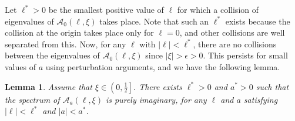 \documentclass[12pt]{amsart}    %
\newtheorem{lemma}[theorem]{Lemma}
\numberwithin{equation}{section}
\begin{document}
Let $\ell^\ast>0$ be the smallest positive value of $\ell$ for which a collision of eigenvalues of $\mathcal A_0(\ell,\xi)$ takes place. Note that such an $\ell^\ast$ exists because the collision at the origin takes place only for $\ell=0$, and other collisions are well separated from this. Now, for any $\ell$ with $|\ell|<\ell^\ast$, there are no collisions between the eigenvalues of $\mathcal A_0(\ell,\xi)$ since $|\xi|>\epsilon>0$. This persists for small values of $a$ using perturbation arguments, and we have the following lemma.  
\begin{lemma}
Assume that $\xi\in\left(0,\frac12\right]$. There exists $\ell^* > 0$ and $a^*>0$ such that the spectrum of $\mathcal A_a(\ell,\xi)$ is purely imaginary, for any $\ell$ and $a$ satisfying $|\ell|<\ell^*$ and $|a|<a^*$.
\end{lemma}
\end{document}
